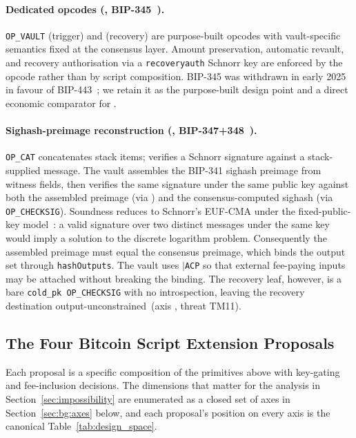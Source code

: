 \paragraph{Dedicated opcodes (\opvault{}, BIP-345~\cite{BIP345}).}
\texttt{OP\_VAULT} (trigger) and \opvaultrecover{} (recovery) are
purpose-built opcodes with vault-specific semantics fixed at the
consensus layer. Amount preservation, automatic revault, and recovery
authorisation via a \texttt{recoveryauth} Schnorr key are enforced by
the opcode rather than by script composition. BIP-345 was withdrawn in
early 2025 in favour of BIP-443~\cite{OB25}; we retain it as the
purpose-built design point and a direct economic comparator for
\opccv{}.

\paragraph{Sighash-preimage reconstruction (\catcsfs{},
BIP-347+348~\cite{Poe21,BIP347,BIP348}).} \texttt{OP\_CAT} concatenates stack
items; \opcsfs{} verifies a Schnorr signature against a
stack-supplied message. The vault assembles the BIP-341 sighash
preimage from witness fields, then verifies the same signature under
the same public key against both the assembled preimage (via
\opcsfs{}) and the consensus-computed sighash (via
\texttt{OP\_CHECKSIG}). Soundness reduces to Schnorr's EUF-CMA under
the fixed-public-key model~\cite{NRS20}: a valid signature over two
distinct messages under the same key would imply a solution to the
discrete logarithm problem. Consequently the assembled preimage must
equal the consensus preimage, which binds the output set through
\texttt{hashOutputs}. The vault uses
$|$\texttt{ACP} so that external fee-paying inputs
may be attached without breaking the binding. The recovery leaf,
however, is a bare \texttt{cold\_pk~OP\_CHECKSIG} with no
introspection, leaving the recovery destination
output-unconstrained~(axis \axrecbind{}, threat TM11).

\subsection{The Four Bitcoin Script Extension Proposals}
\label{sec:bg:designs}

Each proposal is a specific composition of the primitives above with
key-gating and fee-inclusion decisions. The dimensions that matter for
the analysis in Section~\ref{sec:impossibility} are enumerated as a
closed set of axes in Section~\ref{sec:bg:axes} below, and each
proposal's position on every axis is the canonical
Table~\ref{tab:design_space}.

